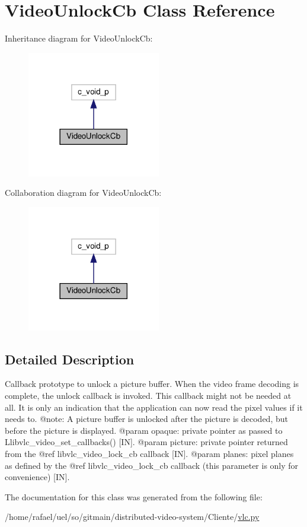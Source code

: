 \hypertarget{classvlc_1_1_video_unlock_cb}{}\section{Video\+Unlock\+Cb Class Reference}
\label{classvlc_1_1_video_unlock_cb}


Inheritance diagram for Video\+Unlock\+Cb\+:
\nopagebreak
\begin{figure}[H]
\begin{center}
\leavevmode
\includegraphics[width=165pt]{classvlc_1_1_video_unlock_cb__inherit__graph}
\end{center}
\end{figure}


Collaboration diagram for Video\+Unlock\+Cb\+:
\nopagebreak
\begin{figure}[H]
\begin{center}
\leavevmode
\includegraphics[width=165pt]{classvlc_1_1_video_unlock_cb__coll__graph}
\end{center}
\end{figure}


\subsection{Detailed Description}
\begin{DoxyVerb}Callback prototype to unlock a picture buffer.
When the video frame decoding is complete, the unlock callback is invoked.
This callback might not be needed at all. It is only an indication that the
application can now read the pixel values if it needs to.
@note: A picture buffer is unlocked after the picture is decoded,
but before the picture is displayed.
@param opaque: private pointer as passed to L{libvlc_video_set_callbacks}() [IN].
@param picture: private pointer returned from the @ref libvlc_video_lock_cb callback [IN].
@param planes: pixel planes as defined by the @ref libvlc_video_lock_cb callback (this parameter is only for convenience) [IN].
\end{DoxyVerb}
 

The documentation for this class was generated from the following file\+:\begin{DoxyCompactItemize}
\item 
/home/rafael/uel/so/gitmain/distributed-\/video-\/system/\+Cliente/\hyperlink{vlc_8py}{vlc.\+py}\end{DoxyCompactItemize}
